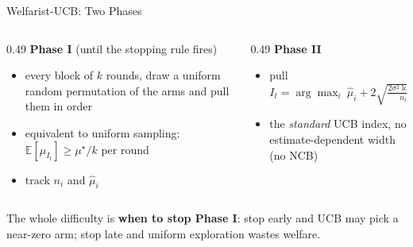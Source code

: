 \documentclass[11pt]{beamer}
\newcommand{\E}{\mathbb{E}}
\newcommand{\mus}{\mu^{\star}}
\begin{document}
\begin{frame}{Welfarist-UCB: Two Phases}
  \centering

  \vspace{6pt}
  \begin{columns}[T]
    \begin{column}{0.49\textwidth}
      \small
      \textbf{Phase I} (until the stopping rule fires)
      \begin{itemize}
        \item every block of $k$ rounds, draw a uniform random permutation of the arms and pull them in order
        \item equivalent to uniform sampling: $\E[\mu_{I_t}]\ge \mus/k$ per round
        \item track $n_i$ and $\widehat\mu_i$
      \end{itemize}
    \end{column}
    \begin{column}{0.49\textwidth}
      \small
      \textbf{Phase II}
      \begin{itemize}
        \item pull $I_t=\arg\max_i\ \widehat\mu_i+2\sqrt{\tfrac{2\sigma^2\log T}{n_i}}$
        \item the \emph{standard} UCB index, no estimate-dependent width (no NCB)
      \end{itemize}
    \end{column}
  \end{columns}

  \vspace{6pt}
  The whole difficulty is \textbf{when to stop Phase I}: stop early and UCB may pick a near-zero arm; stop late and
  uniform exploration wastes welfare.
\end{frame}
\end{document}
